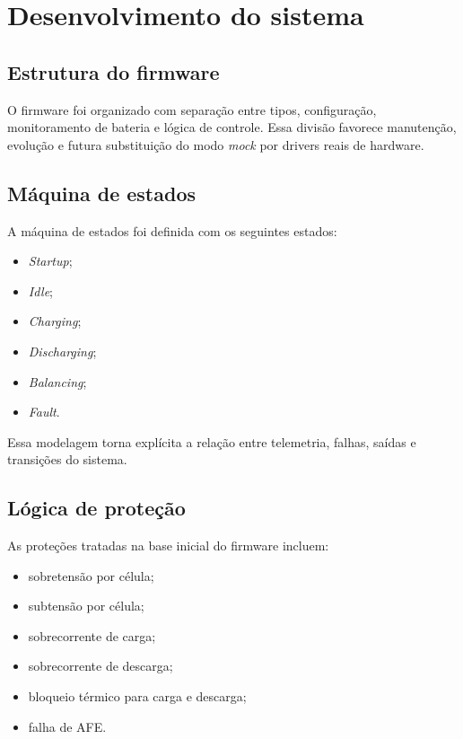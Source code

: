 \chapter{Desenvolvimento do sistema}

\section{Estrutura do firmware}

O firmware foi organizado com separação entre tipos, configuração, monitoramento de bateria e
lógica de controle. Essa divisão favorece manutenção, evolução e futura substituição do modo
\textit{mock} por drivers reais de hardware.

\section{Máquina de estados}

A máquina de estados foi definida com os seguintes estados:

\begin{itemize}
  \item \textit{Startup};
  \item \textit{Idle};
  \item \textit{Charging};
  \item \textit{Discharging};
  \item \textit{Balancing};
  \item \textit{Fault}.
\end{itemize}

Essa modelagem torna explícita a relação entre telemetria, falhas, saídas e transições do
sistema.

\section{Lógica de proteção}

As proteções tratadas na base inicial do firmware incluem:

\begin{itemize}
  \item sobretensão por célula;
  \item subtensão por célula;
  \item sobrecorrente de carga;
  \item sobrecorrente de descarga;
  \item bloqueio térmico para carga e descarga;
  \item falha de AFE.
\end{itemize}

